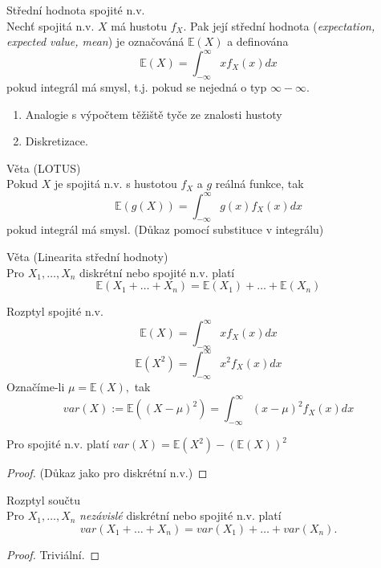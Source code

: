 \documentclass[../main.tex]{subfiles}
\begin{document}
\begin{definition}
    Střední hodnota spojité n.v.\\

    Nechť spojitá n.v. $X$ má hustotu $f_X$. Pak její střední hodnota (\textit{expectation, expected value, mean})
    je označováná $\mathbb{E}(X)$ a definována
    \[\mathbb{E}(X) = \int^\infty_{-\infty} xf_X(x)dx\]
    pokud integrál má smysl, t.j. pokud se nejedná o typ $\infty - \infty$.
    \begin{enumerate}
        \item Analogie s výpočtem těžiště tyče ze znalosti hustoty
        \item Diskretizace.
    \end{enumerate}
\end{definition}
\begin{theorem}
    Věta (LOTUS)\\

    Pokud $X$ je spojitá n.v. s hustotou $f_X$ a $g$ reálná funkce, tak
    \[\mathbb{E}(g(X)) = \int^\infty_{-\infty}g(x) f_X(x)dx\]
    pokud integrál má smysl. (Důkaz pomocí substituce v integrálu)
\end{theorem}
\begin{theorem}
    Věta (Linearita střední hodnoty)\\

    Pro $X_1,\dots,X_n$ diskrétní nebo spojité n.v. platí
    \[\mathbb{E}(X_1 + \dots + X_n) = \mathbb{E}(X_1) + \dots + \mathbb{E}(X_n)\]
\end{theorem}
\begin{definition}
    Rozptyl spojité n.v.\\

    \[\mathbb{E}(X) = \int^\infty_{-\infty} xf_X(x)dx\]
    \[\mathbb{E}(X^2) = \int^\infty_{-\infty} x^2f_X(x)dx\]
    Označíme-li $\mu = \mathbb{E}(X),$ tak
    \[var(X) := \mathbb{E}((X-\mu)^2) = \int^\infty_{-\infty} (x-\mu)^2 f_X(x)dx\]
\end{definition}
\begin{theorem}
    Pro spojité n.v. platí $var(X) = \mathbb{E}(X^2) - (\mathbb{E}(X))^2$\\
    \begin{proof}
    (Důkaz jako pro diskrétní n.v.)
    \end{proof}
\end{theorem}

\begin{theorem}
    Rozptyl součtu\\

    Pro $X_1,\dots,X_n$ \textit{nezávislé} diskrétní nebo spojité n.v. platí
    \[var(X_1 + \dots + X_n) = var(X_1) + \dots + var(X_n).\]

    \begin{proof}
        Triviální.
    \end{proof}
\end{theorem}
\end{document}
